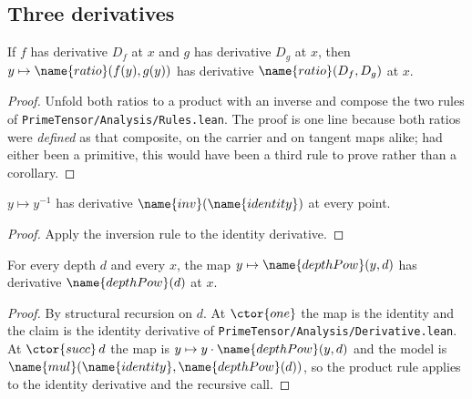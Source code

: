 \subsection{Three derivatives}

\begin{theorem}
\label{Analysis:Examples:thm:ratio}
If $f$ has derivative $D_f$ at $x$ and $g$ has derivative $D_g$ at $x$, then
$y \mapsto \name{ratio}(f(y), g(y))$ has derivative
$\name{ratio}(D_f, D_g)$ at $x$.
\end{theorem}

\begin{proof}
Unfold both ratios to a product with an inverse and compose the two rules of
\texttt{PrimeTensor/Analysis/Rules.lean}.  The proof is one line because both
ratios were \emph{defined} as that composite, on the carrier and on tangent
maps alike; had either been a primitive, this would have been a third rule to
prove rather than a corollary.
\end{proof}

\begin{corollary}
\label{Analysis:Examples:cor:reciprocal}
$y \mapsto y^{-1}$ has derivative $\name{inv}(\name{identity})$ at every point.
\end{corollary}

\begin{proof}
Apply the inversion rule to the identity derivative.
\end{proof}

\begin{theorem}
\label{Analysis:Examples:thm:power}
For every depth $d$ and every $x$, the map $y \mapsto \name{depthPow}(y,d)$ has
derivative $\name{depthPow}(d)$ at $x$.
\end{theorem}

\begin{proof}
By structural recursion on $d$.  At $\ctor{one}$ the map is the identity and
the claim is the identity derivative of
\texttt{PrimeTensor/Analysis/Derivative.lean}.  At $\ctor{succ}\,d$ the map is
$y \mapsto y \cdot \name{depthPow}(y,d)$ and the model is
$\name{mul}(\name{identity}, \name{depthPow}(d))$, so the product rule applies
to the identity derivative and the recursive call.
\end{proof}

